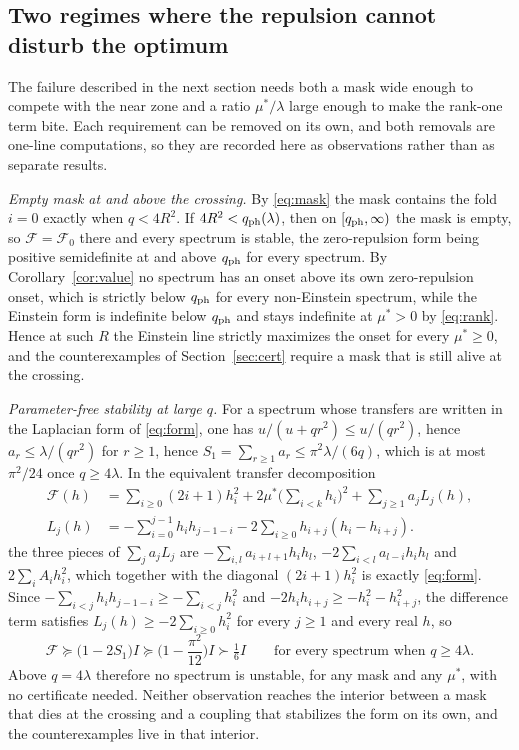 \documentclass[11pt]{article}
\newcommand{\Fcal}{\mathcal F}
\newcommand{\muS}{\mu^{*}}
\theoremstyle{definition}
\theoremstyle{remark}
\begin{document}
\subsection{Two regimes where the repulsion cannot disturb the optimum}

The failure described in the next section needs both a mask wide enough to compete with
the near zone and a ratio $\muS/\lambda$ large enough to make the rank-one term bite. Each
requirement can be removed on its own, and both removals are one-line computations, so
they are recorded here as observations rather than as separate results.

\emph{Empty mask at and above the crossing.} By \eqref{eq:mask} the mask contains the fold
$i=0$ exactly when $q<4R^2$. If $4R^2<q_{\rm ph}(\lambda)$, then on $[q_{\rm ph},\infty)$
the mask is empty, so $\Fcal=\Fcal_0$ there and every spectrum is stable, the zero-repulsion
form being positive semidefinite at and above $q_{\rm ph}$ for every spectrum. By
Corollary~\ref{cor:value} no spectrum has an onset above its own zero-repulsion onset,
which is strictly below $q_{\rm ph}$ for every non-Einstein spectrum, while the Einstein
form is indefinite below $q_{\rm ph}$ and stays indefinite at $\muS>0$ by \eqref{eq:rank}.
Hence at such $R$ the Einstein line strictly maximizes the onset for every $\muS\ge0$, and
the counterexamples of Section~\ref{sec:cert} require a mask that is still alive at the
crossing.

\emph{Parameter-free stability at large $q$.} For a spectrum whose transfers are written
in the Laplacian form of \eqref{eq:form}, one has $u/(u+qr^2)\le u/(qr^2)$, hence
$a_r\le\lambda/(qr^2)$ for $r\ge1$, hence $S_1=\sum_{r\ge1}a_r\le\pi^2\lambda/(6q)$, which
is at most $\pi^2/24$ once $q\ge4\lambda$. In the equivalent transfer decomposition
\begin{equation}\label{eq:decomp}
\begin{aligned}
\Fcal(h)&=\sum_{i\ge0}(2i+1)h_i^2+2\muS\Big(\sum_{i<k}h_i\Big)^2+\sum_{j\ge1}a_jL_j(h),\\
L_j(h)&=-\sum_{i=0}^{j-1}h_ih_{j-1-i}-2\sum_{i\ge0}h_{i+j}(h_i-h_{i+j}).
\end{aligned}
\end{equation}
the three pieces of $\sum_ja_jL_j$ are $-\sum_{i,l}a_{i+l+1}h_ih_l$,
$-2\sum_{i<l}a_{l-i}h_ih_l$ and $2\sum_iA_ih_i^2$, which together with the diagonal
$(2i+1)h_i^2$ is exactly \eqref{eq:form}. Since
$-\sum_{i<j}h_ih_{j-1-i}\ge-\sum_{i<j}h_i^2$ and $-2h_ih_{i+j}\ge-h_i^2-h_{i+j}^2$, the
difference term satisfies $L_j(h)\ge-2\sum_{i\ge0}h_i^2$ for every $j\ge1$ and every real
$h$, so
\begin{equation}\label{eq:asym}
\Fcal\succeq\Big(1-2S_1\Big)I\succeq\Big(1-\frac{\pi^2}{12}\Big)I\succ\tfrac16 I
\qquad\text{for every spectrum when } q\ge4\lambda .
\end{equation}
Above $q=4\lambda$ therefore no spectrum is unstable, for any mask and any $\muS$, with no
certificate needed. Neither observation reaches the interior between a mask that dies at
the crossing and a coupling that stabilizes the form on its own, and the counterexamples
live in that interior.
\end{document}
